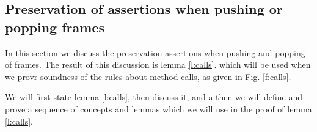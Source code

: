 \subsection{Preservation of assertions when pushing or popping frames}

In this section we  discuss the preservation  assertions when pushing and popping of frames. 
The result of this discussion is  lemma \ref{l:calls}. 
 which will be used when we provr soundness of the rules about method calls, as given in Fig. \ref{f:calls}. 

We will first state  lemma \ref{l:calls}, then discuss it, and a then we will define and prove a sequence of concepts and 
 lemmas which we will use in the proof of lemma \ref{l:calls}.
